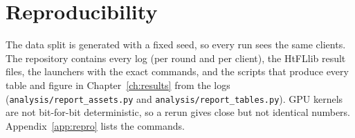 \section{Reproducibility}

The data split is generated with a fixed seed, so every run sees the same clients. The repository contains every log (per round and per client), the HtFLlib result files, the launchers with the exact commands, and the scripts that produce every table and figure in Chapter~\ref{ch:results} from the logs (\texttt{analysis/report\_assets.py} and \texttt{analysis/report\_tables.py}). GPU kernels are not bit-for-bit deterministic, so a rerun gives close but not identical numbers. Appendix~\ref{app:repro} lists the commands.
